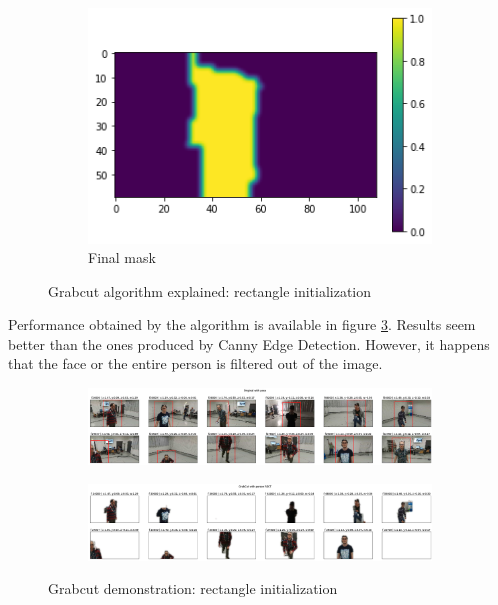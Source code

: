 \begin{figure}[!h]
\begin{center}
\begin{subfigure}[h]{0.32\textwidth}
			\includegraphics[width=1\textwidth]{"contents/images/04-2grabcut-1rect-steps-3"}
			\caption[]{Final mask}
			\label{fig:grabcut-rect-explain-3}
		\end{subfigure}
	\end{center}
	\vspace{-0.5cm}
	\caption[Grabcut algorithm explained: rectangle initialization]{Grabcut algorithm explained: rectangle initialization}
	\label{fig:grabcut-rect-explain}
\end{figure}

Performance obtained by the algorithm is available in figure \ref{fig:grabcut-rect-example}. Results seem better than the ones produced by Canny Edge Detection. However, it happens that the face or the entire person is filtered out of the image.

\begin{figure}[!h]
	\begin{center}
		\begin{subfigure}[h]{1\textwidth}
			\centering
			\includegraphics[width=1\textwidth]{"contents/images/04-2grabcut-1rect-example-1"}
		\end{subfigure}
		\vfill
		\begin{subfigure}[h]{1\textwidth}
			\centering
			\includegraphics[width=1\textwidth]{"contents/images/04-2grabcut-1rect-example-2"}
		\end{subfigure}
	\end{center}
	\vspace{-0.5cm}
	\caption[Grabcut demonstration: rectangle initialization]{Grabcut demonstration: rectangle initialization}
	\label{fig:grabcut-rect-example}
\end{figure}


